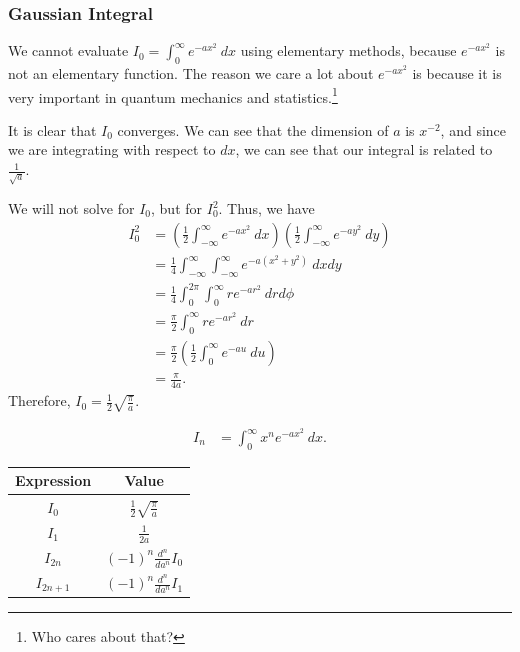 \documentclass[10pt]{mypackage}
\begin{document}
\subsubsection{Gaussian Integral}%
We cannot evaluate $I_0 = \int_{0}^{\infty} e^{-ax^2}\:dx$ using elementary methods, because $e^{-ax^2}$ is not an elementary function. The reason we care a lot about $e^{-ax^2}$ is because it is very important in quantum mechanics and statistics.\footnote{Who cares about that?}\newline

It is clear that $I_0$ converges. We can see that the dimension of $a$ is $x^{-2}$, and since we are integrating with respect to $dx$, we can see that our integral is related to $\frac{1}{\sqrt{a}}$.
\begin{example}
  We will not solve for $I_0$, but for $I_0^2$. Thus, we have
  \begin{align*}
    I_0^2 &= \left(\frac{1}{2}\int_{-\infty}^{\infty} e^{-ax^2}\:dx\right)\left(\frac{1}{2}\int_{-\infty}^{\infty} e^{-ay^2}\:dy\right)\\
          &= \frac{1}{4}\int_{-\infty}^{\infty}\int_{-\infty}^{\infty} e^{-a\left(x^2 + y^2\right)}\:dxdy\\
          &= \frac{1}{4}\int_{0}^{2\pi}\int_{0}^{\infty} re^{-ar^2}\:drd\phi\\
          &= \frac{\pi}{2}\int_{0}^{\infty} re^{-ar^2}\:dr\\
          &= \frac{\pi}{2}\left(\frac{1}{2}\int_{0}^{\infty} e^{-au}\:du\right)\\
          &= \frac{\pi}{4a}.
  \end{align*}
  Therefore, $I_0 = \frac{1}{2}\sqrt{\frac{\pi}{a}}$.
\end{example}
\begin{definition}
\begin{align*}
  I_n &= \int_{0}^{\infty} x^ne^{-ax^2}\:dx.
\end{align*}
\end{definition}
\begin{center}
  \renewcommand{\arraystretch}{1.5}
  \begin{tabular}{c|c}
    Expression & Value\\
    \hline
    $I_0$ & $\frac{1}{2}\sqrt{\frac{\pi}{a}}$\\
    $I_1$ & $\frac{1}{2a}$\\
    $I_{2n}$ & $(-1)^{n}\frac{d^{n}}{da^{n}}I_0$\\
    $I_{2n+1}$ & $\left(-1\right)^{n}\frac{d^{n}}{da^{n}}I_1$
  \end{tabular}
\end{center}
\end{document}
